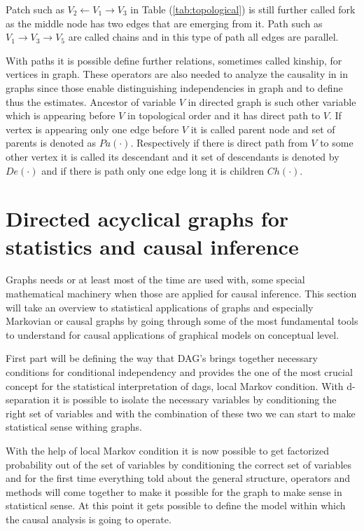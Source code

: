 \documentclass[main=english,12pt,a4paper,pdftex,econ,utf8]{aaltothesis}
\newcommand{\ch}[1]{Ch(#1)}
\newcommand{\pa}[1]{Pa(#1)}
\newcommand{\de}[1]{De(#1)}
\begin{document}
Patch such as $V_{2}\leftarrow V_{1}\rightarrow V_{3}$ in Table (\ref{tab:topological}) is still further called fork as the middle node has two edges that are emerging from it. Path such as $V_{1}\rightarrow V_{3}\rightarrow V_{5}$ are called chains and in this type of path all edges are parallel.

With paths it is possible define further relations, sometimes called kinship, for vertices in graph. These operators are also needed to analyze the causality in in graphs since those enable distinguishing independencies in graph and to define thus the estimates. Ancestor of variable $V$ in directed graph is such other variable which is appearing before $V$ in topological order and it has direct path to $V$. If vertex is appearing only one edge before $V$ it is called parent node and set of parents is denoted as $\pa{\bm{\cdot}}$. Respectively if there is direct path from $V$ to some other vertex it is called its descendant and it set of descendants is denoted by $\de{\bm{\cdot}}$ and if there is path only one edge long it is children $\ch{\bm{\cdot}}$.

\clearpage

\section{Directed acyclical graphs for statistics and causal inference}

Graphs needs or at least most of the time are used with, some special mathematical machinery when those are applied for causal inference. This section will take an overview to statistical applications of graphs and especially Markovian or causal graphs by going through some of the most fundamental tools to understand for causal applications of graphical models on conceptual level.

First part will be defining the way that DAG's brings together necessary conditions for conditional independency and provides the one of the most crucial concept for the statistical interpretation of dags, local Markov condition. With d-separation it is possible to isolate the necessary variables by conditioning the right set of variables and with the combination of these two we can start to make statistical sense withing graphs.

With the help of local Markov condition it is now possible to get factorized probability out of the set of variables by conditioning the correct set of variables and for the first time everything told about the general structure, operators and methods will come together to make it possible for the graph to make sense in statistical sense. At this point it gets possible to define the model within which the causal analysis is going to operate.
\end{document}
